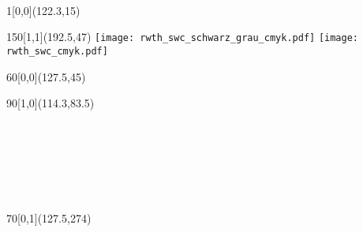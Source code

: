 \begin{titlepage}
  ~ %

  \begin{textblock}{1}[0,0](122.3,15)
    \noindent
    \ifisbw
    \else
    \fi
  \end{textblock}
	\begin{textblock}{150}[1,1](192.5,47)
    \noindent\flushright\noindent
    \ifisbw
      \texttt{[image: rwth\_swc\_schwarz\_grau\_cmyk.pdf]}
    \else
      \texttt{[image: rwth\_swc\_cmyk.pdf]}
    \fi
	\end{textblock}

  \begin{textblock}{60}[0,0](127.5,45)
    \noindent\flushleft
    \\[.5\baselineskip]
  \end{textblock}

  \begin{textblock}{90}[1,0](114.3,83.5)
    \begin{minipage}[!c][140mm][c]{90mm}
      \noindent\flushright
      \noindent{\textsc{\THESISTYPE}}\\[2\baselineskip]

      {
        \noindent{\LARGE{\textbf{\TITLEENG}}}\\[1\baselineskip]
        \noindent{\LARGE{}}
      }\\[2\baselineskip]

      \\[.5\baselineskip]
      \noindent{\textbf{{\AUTHOR}}}\\[2\baselineskip]
      
    \end{minipage}
  \end{textblock}


  \begin{textblock}{70}[0,1](127.5,274)
    \noindent\flushleft
    \\[.5\baselineskip]
    \noindent{{\REVIEWERONE}}\\[.5\baselineskip]
    \noindent{{\REVIEWERTWO}}\\[2\baselineskip]

    \\[.5\baselineskip]
    \noindent{{\SUPERVISOR}}
  \end{textblock}

\end{titlepage} 